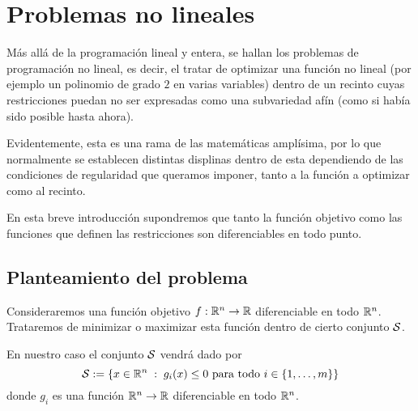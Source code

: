 \chapter{Problemas no lineales}
Más allá de la programación lineal y entera, se hallan los problemas de programación no lineal, es decir, el tratar de optimizar una función no lineal (por ejemplo un polinomio de grado $2$ en varias variables) dentro de un recinto cuyas restricciones puedan no ser expresadas como una subvariedad afín (como si había sido posible hasta ahora).

Evidentemente, esta es una rama de las matemáticas amplísima, por lo que normalmente se establecen distintas displinas dentro de esta dependiendo de las condiciones de regularidad que queramos imponer, tanto a la función a optimizar como al recinto.

En esta breve introducción supondremos que tanto la función objetivo como las funciones que definen las restricciones son diferenciables en todo punto.
\label{nolin}
\section{Planteamiento del problema}
Consideraremos una función objetivo $f:\mathbb{R}^n\to\mathbb{R}$ diferenciable en todo $\mathbb{R}^n$. Trataremos de minimizar o maximizar esta función dentro de cierto conjunto $\mathcal{S}$.

En nuestro caso el conjunto $\mathcal{S}$ vendrá dado por
\begin{equation*}
	\mathcal{S}:=\{x\in\mathbb{R}^n\;:\; g_i(x)\leq 0\text{ para todo }i\in\{1,\dots,m\}\}
\end{equation*}
donde $g_i$ es una función $\mathbb{R}^n\to\mathbb{R}$ diferenciable en todo $\mathbb{R}^n$.
